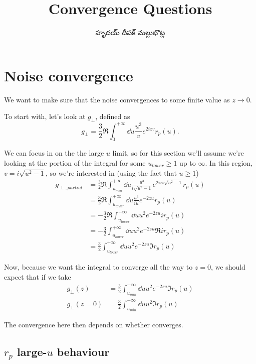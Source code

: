 \documentclass[../main.tex]{subfiles}
\title{Convergence Questions}
\author{\begin{telugu}హృదయ్ దీపక్ మల్లుభొట్ల\end{telugu}}
\date{}
\begin{document}
	\graphicspath{{\main/figures/}}

	\onlyinsubfile{\maketitle}

	\section{Noise convergence} \label{sec:convergence}

	We want to make sure that the noise convergences to some finite value as $z \rightarrow 0$.

	To start with, let's look at $g_\perp$, defined as
	\begin{equation}
		g_\perp = \frac32 \Re \int_0^{+\infty} \dd{u} \frac{u^3}{v} e^{2 i z v} r_p(u).
	\end{equation}

	We can focus in on the the large $u$ limit, so for this section we'll assume we're looking at the portion of the integral
	for some $u_{lower} \geq 1$ up to $\infty$.
	In this region, $v = i \sqrt{u^2 - 1}$, so we're interested in (using the fact that $u \geq 1$)
	\begin{align}
		g_{\perp,partial} &= \frac32 \Re \int_{u_{min}}^{+\infty} \dd{u} \frac{u^3}{i \sqrt{u^2 - 1}} e^{2 i z i \sqrt{u^2 - 1}} r_p(u) \\
		&= \frac32 \Re \int_{u_{lower}}^{+\infty} \dd{u} \frac{u^3}{i u} e^{-2 z u} r_p(u) \\
		&= - \frac32 \Re \int_{u_{lower}}^{+\infty} \dd{u} u^2 e^{-2 z u} i r_p(u) \\
		&= - \frac32 \int_{u_{lower}}^{+\infty} \dd{u} u^2 e^{-2 z u} \Re{i r_p(u)} \\
		&= \frac32 \int_{u_{lower}}^{+\infty} \dd{u} u^2 e^{-2 z u} \Im r_p(u)
	\end{align}

	Now, because we want the integral to converge all the way to $z = 0$, we should expect that if we take
	\begin{align}
		g_\perp(z) &= \frac32 \int_{u_{min}}^{+\infty} \dd{u} u^2 e^{-2 z u} \Im r_p(u) \\
		g_\perp(z = 0) &= \frac32 \int_{u_{min}}^{+\infty} \dd{u} u^2 \Im r_p(u) \label{eq:gperpsimplest}
	\end{align}

	The convergence here then depends on whether  converges.

	\subsection{$r_p$ large-$u$ behaviour} \label{subsec:largeurpbehav}
\end{document}
